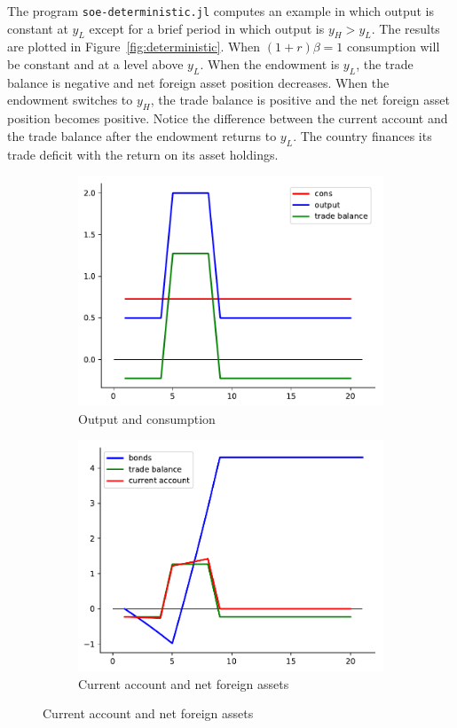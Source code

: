 \documentclass[11pt,pdftex,twoside,letterpaper]{exam}
\begin{document}
The program \texttt{soe-deterministic.jl} computes an example in which output is constant at $y_L$ except for a brief period in which output is $y_H>y_L$. The results are plotted in Figure~\ref{fig:deterministic}. When $(1+r)\beta=1$ consumption will be constant and at a level above $y_L$. When the endowment is $y_L$, the trade balance is negative and net foreign asset position decreases. When the endowment switches to $y_H$, the trade balance is positive and the net foreign asset position becomes positive. Notice the difference between the current account and the trade balance after the endowment returns to $y_L$. The country finances its trade deficit with the return on its asset holdings.
\begin{figure}
  \centering
  \caption{Deterministic fluctuation in endowment}\label{fig:deterministic}
  \begin{subfigure}{0.49\textwidth}
    \includegraphics[width=\textwidth]{figures/cy.pdf}
    \caption{Output and consumption}
  \end{subfigure}
  \begin{subfigure}{0.49\textwidth}
    \includegraphics[width=\textwidth]{figures/debt.pdf}
    \caption{Current account and net foreign assets}
  \end{subfigure}
\end{figure}
\end{document}
